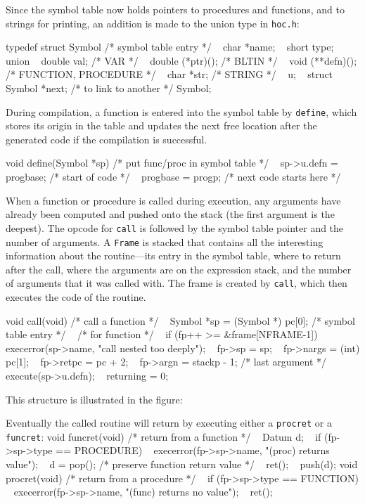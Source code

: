 Since the symbol table now holds pointers to procedures and functions,
and to strings for printing, an addition is made to the union type
in {\tt hoc.h}:

\begincode
typedef struct Symbol {  /* symbol table entry */
~       char    *name;
~       short   type;
~       union {
~               double  val;         /* VAR */
~               double  (*ptr)();    /* BLTIN */
~               void    (**defn)();  /* FUNCTION, PROCEDURE */
~               char    *str;        /* STRING */
~       } u;
~       struct Symbol *next;  /* to link to another */
} Symbol;
\endcode

\noindent
During compilation, a function is entered into the symbol table
by {\tt define}, which stores its origin in the table and updates
the next free location after the generated code if the compilation
is successful.

\begincode
void define(Symbol *sp)  /* put func/proc in symbol table */
{
~       sp->u.defn = progbase;  /* start of code */
~       progbase = progp;       /* next code starts here */
}
\endcode

When a function or procedure is called during execution, any
arguments have already been computed and pushed onto the stack
(the first argument is the deepest). The opcode for {\tt call}
is followed by the symbol table pointer and the number of
arguments. A {\tt Frame} is stacked that contains all the
interesting information about the routine---its entry in
the symbol table, where to return after the call, where the
arguments are on the expression stack, and the number of
arguments that it was called with. The frame is created by
{\tt call}, which then executes the code of the routine.

\begincode
void call(void)  /* call a function */
{
~       Symbol *sp = (Symbol *) pc[0];  /* symbol table entry */
~                                       /* for function */
~       if (fp++ >= &frame[NFRAME-1])
~               execerror(sp->name, "call nested too deeply");
~       fp->sp = sp;
~       fp->nargs = (int) pc[1];
~       fp->retpc = pc + 2;
~       fp->argn = stackp - 1;  /* last argument */
~       execute(sp->u.defn);
~       returning = 0;
}
\endcode

\goodbreak\noindent
This structure is illustrated in the figure:
\nobreak\medskip
\centerline{}
\medbreak

Eventually the called routine will return by executing either
a {\tt procret} or a {\tt funcret}:
\begincode
void funcret(void)  /* return from a function */
{
~       Datum d;
~       if (fp->sp->type == PROCEDURE)
~           execerror(fp->sp->name, "(proc) returns value");
~       d = pop();  /* preserve function return value */
~       ret();
~       push(d);
}
\medbreak
void procret(void)  /* return from a procedure */
{
~       if (fp->sp->type == FUNCTION)
~           execerror(fp->sp->name, "(func) returns no value");
~       ret();
}
\endcode


